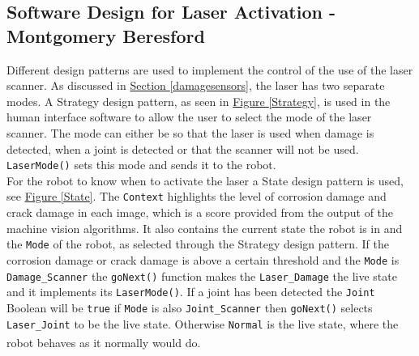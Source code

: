 \documentclass[11pt]{article}		%
\newcommand{\supercite}[1]{\textsuperscript{\cite{#1}}}		%
\newcommand{\figref}[1]{\hyperref[#1]{Figure \ref*{#1}}}    %
\newcommand{\sectref}[1]{\hyperref[#1]{Section \ref*{#1}}}     %
\begin{document}
	        
	        
	        \subsection[Software Design for Laser Activation]{Software Design for Laser Activation - Montgomery Beresford}
	         Different design patterns are used to implement the control of the use of the laser scanner. As discussed in \sectref{damagesensors}, the laser has two separate modes.
	        A Strategy design pattern, as seen in \figref{Strategy}, is used in the human interface software to allow the user to select the mode of the laser scanner. The mode can either be so that the laser is used when damage is detected, when a joint is detected or that the scanner will not be used. \verb|LaserMode()| sets this mode and sends it to the robot.	   \\
            \hspace*{2ex}For the robot to know when to activate the laser a State design pattern is used, see \figref{State}. The \verb|Context| highlights the level of corrosion damage and crack damage in each image, which is a score provided from the output of the machine vision algorithms. It also contains the current state the robot is in and the \verb|Mode| of the robot, as selected through the Strategy design pattern. If the corrosion damage or crack damage is above a certain threshold and the \verb|Mode| is \verb|Damage_Scanner| the \verb|goNext()| function makes the \verb|Laser_Damage| the live state and it implements its \verb|LaserMode()|. If a joint has been detected the \verb|Joint| Boolean will be \verb|true| if \verb|Mode| is also \verb|Joint_Scanner| then \verb|goNext()| selects \verb|Laser_Joint| to be the live state. Otherwise \verb|Normal| is the live state, where the robot behaves as it normally would do\supercite{Design_Patterns}.
	        
\end{document}
